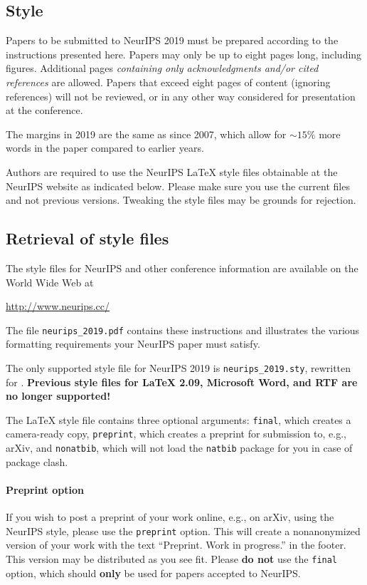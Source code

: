 \documentclass{article}
\begin{document}
	\subsection{Style}
	
	Papers to be submitted to NeurIPS 2019 must be prepared according to the
	instructions presented here. Papers may only be up to eight pages long,
	including figures. Additional pages \emph{containing only acknowledgments and/or
		cited references} are allowed. Papers that exceed eight pages of content
	(ignoring references) will not be reviewed, or in any other way considered for
	presentation at the conference.
	
	The margins in 2019 are the same as since 2007, which allow for $\sim$$15\%$
	more words in the paper compared to earlier years.
	
	Authors are required to use the NeurIPS \LaTeX{} style files obtainable at the
	NeurIPS website as indicated below. Please make sure you use the current files
	and not previous versions. Tweaking the style files may be grounds for
	rejection.
	
	\subsection{Retrieval of style files}
	
	The style files for NeurIPS and other conference information are available on
	the World Wide Web at
	\begin{center}
		\url{http://www.neurips.cc/}
	\end{center}
	The file \verb+neurips_2019.pdf+ contains these instructions and illustrates the
	various formatting requirements your NeurIPS paper must satisfy.
	
	The only supported style file for NeurIPS 2019 is \verb+neurips_2019.sty+,
	rewritten for \LaTeXe{}.  \textbf{Previous style files for \LaTeX{} 2.09,
		Microsoft Word, and RTF are no longer supported!}
	
	The \LaTeX{} style file contains three optional arguments: \verb+final+, which
	creates a camera-ready copy, \verb+preprint+, which creates a preprint for
	submission to, e.g., arXiv, and \verb+nonatbib+, which will not load the
	\verb+natbib+ package for you in case of package clash.
	
	\paragraph{Preprint option}
	If you wish to post a preprint of your work online, e.g., on arXiv, using the
	NeurIPS style, please use the \verb+preprint+ option. This will create a
	nonanonymized version of your work with the text ``Preprint. Work in progress.''
	in the footer. This version may be distributed as you see fit. Please \textbf{do
		not} use the \verb+final+ option, which should \textbf{only} be used for
	papers accepted to NeurIPS.
	
\end{document}
